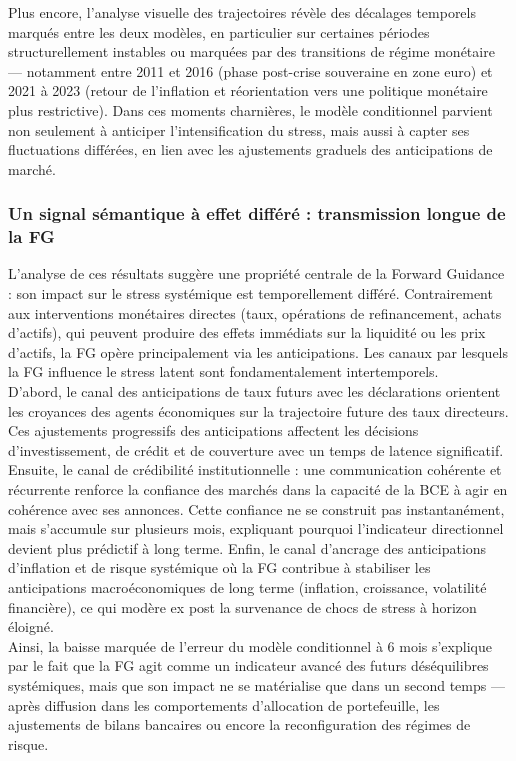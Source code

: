 Plus encore, l’analyse visuelle des trajectoires révèle des décalages temporels marqués entre les deux modèles, en particulier sur certaines périodes structurellement instables ou marquées par des transitions de régime monétaire — notamment entre 2011 et 2016 (phase post-crise souveraine en zone euro) et 2021 à 2023 (retour de l’inflation et réorientation vers une politique monétaire plus restrictive). Dans ces moments charnières, le modèle conditionnel parvient non seulement à anticiper l’intensification du stress, mais aussi à capter ses fluctuations différées, en lien avec les ajustements graduels des anticipations de marché.

\subsubsection{Un signal sémantique à effet différé : transmission longue de la FG}

L’analyse de ces résultats suggère une propriété centrale de la Forward Guidance : son impact sur le stress systémique est temporellement différé. Contrairement aux interventions monétaires directes (taux, opérations de refinancement, achats d’actifs), qui peuvent produire des effets immédiats sur la liquidité ou les prix d’actifs, la FG opère principalement via les anticipations. Les canaux par lesquels la FG influence le stress latent sont fondamentalement intertemporels.\\

D'abord, le canal des anticipations de taux futurs avec les déclarations orientent les croyances des agents économiques sur la trajectoire future des taux directeurs. Ces ajustements progressifs des anticipations affectent les décisions d’investissement, de crédit et de couverture avec un temps de latence significatif. Ensuite, le canal de crédibilité institutionnelle : une communication cohérente et récurrente renforce la confiance des marchés dans la capacité de la BCE à agir en cohérence avec ses annonces. Cette confiance ne se construit pas instantanément, mais s’accumule sur plusieurs mois, expliquant pourquoi l’indicateur directionnel devient plus prédictif à long terme. Enfin, le canal d’ancrage des anticipations d’inflation et de risque systémique où la FG contribue à stabiliser les anticipations macroéconomiques de long terme (inflation, croissance, volatilité financière), ce qui modère ex post la survenance de chocs de stress à horizon éloigné.\\

Ainsi, la baisse marquée de l’erreur du modèle conditionnel à 6 mois s’explique par le fait que la FG agit comme un indicateur avancé des futurs déséquilibres systémiques, mais que son impact ne se matérialise que dans un second temps — après diffusion dans les comportements d’allocation de portefeuille, les ajustements de bilans bancaires ou encore la reconfiguration des régimes de risque.

